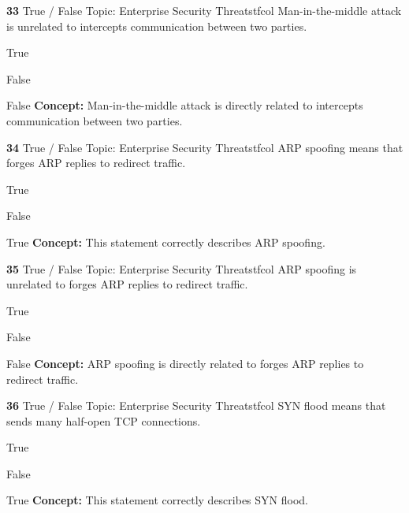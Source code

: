 \documentclass[10pt,a4paper]{article}
\begin{document}
\begin{qcard}{\color{white}\textbf{33} \hfill \small True / False \textbar{} Topic: Enterprise Security Threats}{tfcol}
Man-in-the-middle attack is unrelated to intercepts communication between two parties.

\begin{qoptions}
\item True
\item False
\end{qoptions}
\begin{explainbox}{False}
\textbf{Concept:} Man-in-the-middle attack is directly related to intercepts communication between two parties.
\end{explainbox}
\end{qcard}

\begin{qcard}{\color{white}\textbf{34} \hfill \small True / False \textbar{} Topic: Enterprise Security Threats}{tfcol}
ARP spoofing means that forges ARP replies to redirect traffic.

\begin{qoptions}
\item True
\item False
\end{qoptions}
\begin{explainbox}{True}
\textbf{Concept:} This statement correctly describes ARP spoofing.
\end{explainbox}
\end{qcard}

\begin{qcard}{\color{white}\textbf{35} \hfill \small True / False \textbar{} Topic: Enterprise Security Threats}{tfcol}
ARP spoofing is unrelated to forges ARP replies to redirect traffic.

\begin{qoptions}
\item True
\item False
\end{qoptions}
\begin{explainbox}{False}
\textbf{Concept:} ARP spoofing is directly related to forges ARP replies to redirect traffic.
\end{explainbox}
\end{qcard}

\begin{qcard}{\color{white}\textbf{36} \hfill \small True / False \textbar{} Topic: Enterprise Security Threats}{tfcol}
SYN flood means that sends many half-open TCP connections.

\begin{qoptions}
\item True
\item False
\end{qoptions}
\begin{explainbox}{True}
\textbf{Concept:} This statement correctly describes SYN flood.
\end{explainbox}
\end{qcard}
\end{document}
